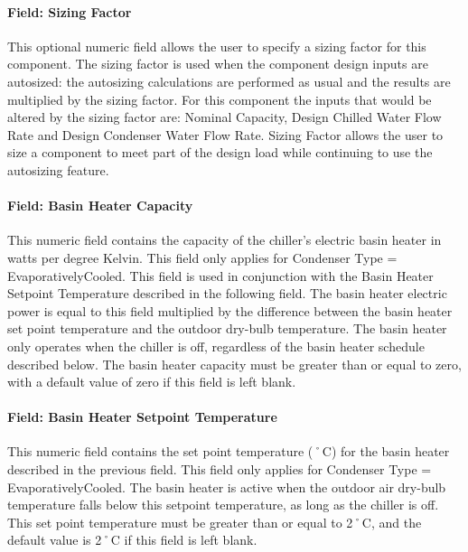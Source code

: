 \paragraph{Field: Sizing Factor}\label{field-sizing-factor-6}

This optional numeric field allows the user to specify a sizing factor for this component. The sizing factor is used when the component design inputs are autosized: the autosizing calculations are performed as usual and the results are multiplied by the sizing factor. For this component the inputs that would be altered by the sizing factor are: Nominal Capacity, Design Chilled Water Flow Rate and Design Condenser Water Flow Rate. Sizing Factor allows the user to size a component to meet part of the design load while continuing to use the autosizing feature.

\paragraph{Field: Basin Heater Capacity}\label{field-basin-heater-capacity-3-001}

This numeric field contains the capacity of the chiller's electric basin heater in watts per degree Kelvin. This field only applies for Condenser Type = EvaporativelyCooled. This field is used in conjunction with the Basin Heater Setpoint Temperature described in the following field. The basin heater electric power is equal to this field multiplied by the difference between the basin heater set point temperature and the outdoor dry-bulb temperature. The basin heater only operates when the chiller is off, regardless of the basin heater schedule described below. The basin heater capacity must be greater than or equal to zero, with a default value of zero if this field is left blank.

\paragraph{Field: Basin Heater Setpoint Temperature}\label{field-basin-heater-setpoint-temperature-3-001}

This numeric field contains the set point temperature (˚C) for the basin heater described in the previous field. This field only applies for Condenser Type = EvaporativelyCooled. The basin heater is active when the outdoor air dry-bulb temperature falls below this setpoint temperature, as long as the chiller is off. This set point temperature must be greater than or equal to 2˚C, and the default value is 2˚C if this field is left blank.

